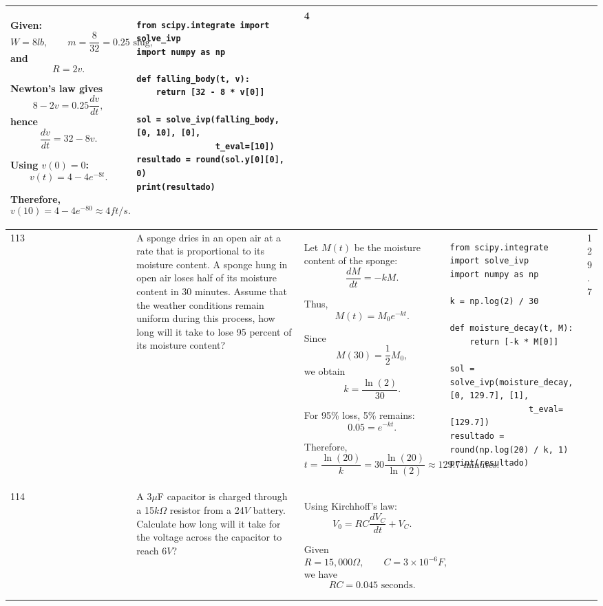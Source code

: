 \documentclass[a4paper,12pt]{article}
\begin{document}
\begin{longtable}{|p{0.3cm}|p{}|p{10cm}|p{}|p{1.5cm}|}
Given:
\[
W=8lb,\qquad m=\frac{8}{32}=0.25\text{ slug},
\]
and
\[
R=2v.
\]

Newton's law gives
\[
8-2v=0.25\frac{dv}{dt},
\]
hence
\[
\frac{dv}{dt}=32-8v.
\]

Using \(v(0)=0\):
\[
v(t)=4-4e^{-8t}.
\]

Therefore,
\[
v(10)=4-4e^{-80}\approx4ft/s.
\] &
\begin{verbatim}
from scipy.integrate import solve_ivp
import numpy as np

def falling_body(t, v):
    return [32 - 8 * v[0]]

sol = solve_ivp(falling_body, [0, 10], [0],
                t_eval=[10])
resultado = round(sol.y[0][0], 0)
print(resultado)
\end{verbatim}
& 4 \\ \hline

113 & A sponge dries in an open air at a rate that is proportional to its moisture content. A sponge hung in open air loses half of its moisture content in 30 minutes. Assume that the weather conditions remain uniform during this process, how long will it take to lose 95 percent of its moisture content? &
Let \(M(t)\) be the moisture content of the sponge:
\[
\frac{dM}{dt}=-kM.
\]

Thus,
\[
M(t)=M_0e^{-kt}.
\]

Since
\[
M(30)=\frac12M_0,
\]
we obtain
\[
k=\frac{\ln(2)}{30}.
\]

For 95\% loss, 5\% remains:
\[
0.05=e^{-kt}.
\]

Therefore,
\[
t=\frac{\ln(20)}{k}
=30\frac{\ln(20)}{\ln(2)}
\approx129.7\text{ minutes}.
\] &
\begin{verbatim}
from scipy.integrate import solve_ivp
import numpy as np

k = np.log(2) / 30

def moisture_decay(t, M):
    return [-k * M[0]]

sol = solve_ivp(moisture_decay, [0, 129.7], [1],
                t_eval=[129.7])
resultado = round(np.log(20) / k, 1)
print(resultado)
\end{verbatim}
& 129.7 \\ \hline

114 & A 3$\mu$F capacitor is charged through a 15$k\Omega$ resistor from a 24$V$ battery. Calculate how long will it take for the voltage across the capacitor to reach 6$V$? &
Using Kirchhoff’s law:
\[
V_0=RC\frac{dV_C}{dt}+V_C.
\]

Given
\[
R=15,000\Omega,\qquad C=3\times10^{-6}F,
\]
we have
\[
RC=0.045\text{ seconds}.
\]


\end{longtable}
\end{document}
